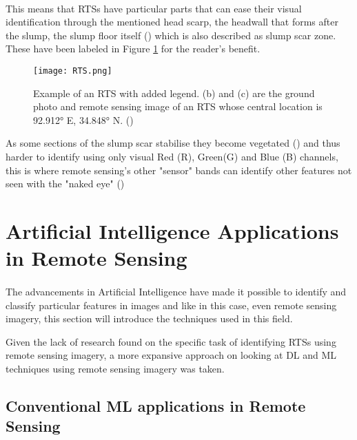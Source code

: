  \paragraph{}
This means that \gls{RTS}s have particular parts that can ease their visual identification through the mentioned head scarp, the headwall that forms after the slump, the slump floor itself (\cite{LANTUIT200884}) which is also described as slump scar zone. These have been labeled in Figure \ref{fig_RTS} for the reader's benefit. 

    \begin{figure}[hbt!]
        \centering
        \texttt{[image: RTS.png]}
        \caption{Example of an \gls{RTS} with added legend. (b) and (c) are the
ground photo and remote sensing image of an \gls{RTS} whose central location is 92.912° E, 34.848° N. (\cite{HUANG2020111534})}
        \label{fig_RTS}
    \end{figure}


As some sections of the slump scar stabilise they become vegetated (\cite{KOKELJ201556}) and thus harder to identify using only visual Red (R), Green(G) and Blue (B) channels, this is where remote sensing's other "sensor" bands can identify other features not seen with the "naked eye" (\cite{HUANG2020111534})

\section{Artificial Intelligence Applications in Remote Sensing}  \label{ai_rs}
\paragraph{}
The advancements in Artificial Intelligence have made it possible to identify and classify particular features in images and like in this case, even remote sensing imagery, this section will introduce the techniques used in this field.


Given the lack of research found on the specific task of identifying \gls{RTS}s using remote sensing imagery, a more expansive approach on looking at \gls{DL} and \gls{ML} techniques using remote sensing imagery was taken.

\subsection{Conventional \gls{ML} applications in Remote Sensing}  \label{ml_rs}

